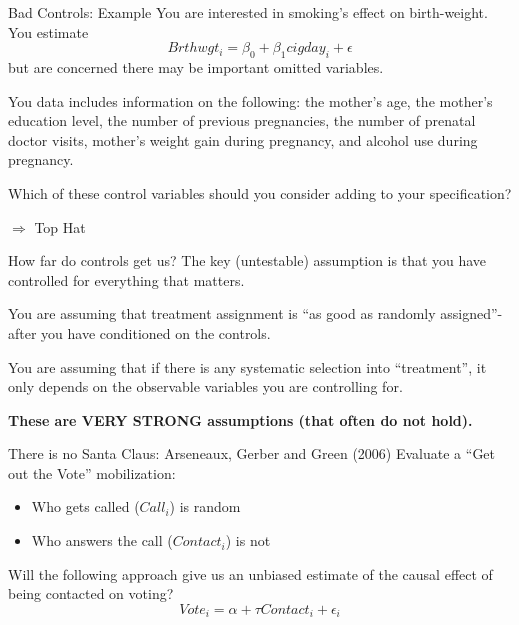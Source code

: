 \documentclass[
  ignorenonframetext,
]{beamer}
\begin{document}
\begin{frame}{Bad Controls: Example}
\protect\hypertarget{bad-controls-example}{}
You are interested in smoking's effect on birth-weight. You estimate \[
Brthwgt_i=\beta_0+\beta_1cigday_i+\epsilon
\] but are concerned there may be important omitted variables.

You data includes information on the following: the mother's age, the
mother's education level, the number of previous pregnancies, the number
of prenatal doctor visits, mother's weight gain during pregnancy, and
alcohol use during pregnancy.

Which of these control variables should you consider adding to your
specification?

\(\Rightarrow\) Top Hat
\end{frame}

\begin{frame}{How far do controls get us?}
\protect\hypertarget{how-far-do-controls-get-us}{}
The key (untestable) assumption is that you have controlled for
everything that matters.

You are assuming that treatment assignment is ``as good as randomly
assigned''- after you have conditioned on the controls.

You are assuming that if there is any systematic selection into
``treatment'', it only depends on the observable variables you are
controlling for.

\textbf{These are VERY STRONG assumptions (that often do not hold).}
\end{frame}

\begin{frame}{There is no Santa Claus: Arseneaux, Gerber and Green
(2006)}
\protect\hypertarget{there-is-no-santa-claus-arseneaux-gerber-and-green-2006}{}
Evaluate a ``Get out the Vote'' mobilization:

\begin{itemize}
\item
  Who gets called (\(Call_i\)) is random
\item
  Who answers the call (\(Contact_i\)) is not
\end{itemize}

Will the following approach give us an unbiased estimate of the causal
effect of being contacted on voting? \[
Vote_i=\alpha+\tau Contact_i+\epsilon_i
\]
\end{frame}
\end{document}
